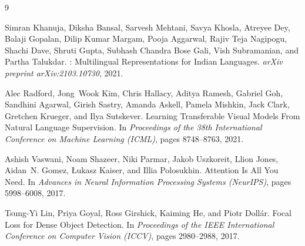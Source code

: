 \documentclass[
]{ceurart}
\begin{document}
\begin{thebibliography}{9}

Simran Khanuja, Diksha Bansal, Sarvesh Mehtani, Savya Khosla, Atreyee Dey, Balaji Gopalan, Dilip Kumar Margam, Pooja Aggarwal, Rajiv Teja Nagipogu, Shachi Dave, Shruti Gupta, Subhash Chandra Bose Gali, Vish Subramanian, and Partha Talukdar.
: Multilingual Representations for Indian Languages.
\newblock \emph{arXiv preprint arXiv:2103.10730}, 2021.

Alec Radford, Jong~Wook Kim, Chris Hallacy, Aditya Ramesh, Gabriel Goh, Sandhini Agarwal, Girish Sastry, Amanda Askell, Pamela Mishkin, Jack Clark, Gretchen Krueger, and Ilya Sutskever.
\newblock Learning Transferable Visual Models From Natural Language Supervision.
\newblock In \emph{Proceedings of the 38th International Conference on Machine Learning (ICML)}, pages 8748--8763, 2021.

Ashish Vaswani, Noam Shazeer, Niki Parmar, Jakob Uszkoreit, Llion Jones, Aidan~N. Gomez, \L{}ukasz Kaiser, and Illia Polosukhin.
\newblock Attention Is All You Need.
\newblock In \emph{Advances in Neural Information Processing Systems (NeurIPS)}, pages 5998--6008, 2017.

Tsung-Yi Lin, Priya Goyal, Ross Girshick, Kaiming He, and Piotr Doll\'{a}r.
\newblock Focal Loss for Dense Object Detection.
\newblock In \emph{Proceedings of the IEEE International Conference on Computer Vision (ICCV)}, pages 2980--2988, 2017.

\end{thebibliography}
\end{document}
